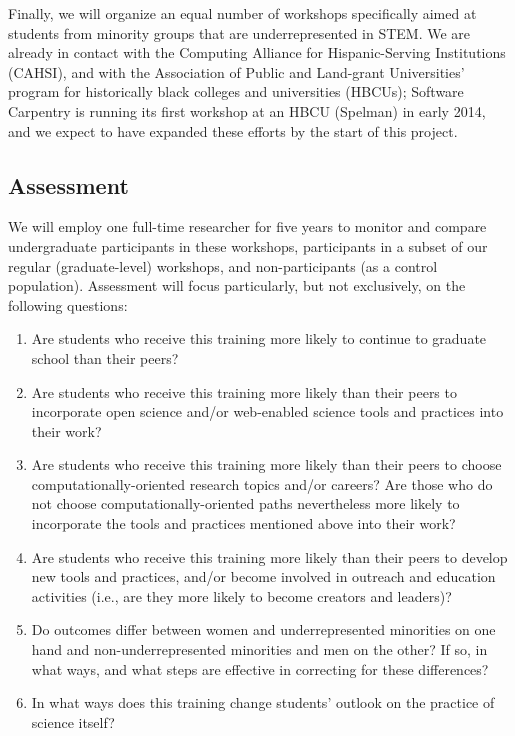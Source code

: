 \documentclass[11pt]{article}
\begin{document}
Finally, we will organize an equal number of workshops specifically
aimed at students from minority groups that are underrepresented in
STEM.  We are already in contact with the Computing Alliance for
Hispanic-Serving Institutions (CAHSI), and with the Association of
Public and Land-grant Universities' program for historically black
colleges and universities (HBCUs); Software Carpentry is running its
first workshop at an HBCU (Spelman) in early 2014, and we expect to
have expanded these efforts by the start of this project.

\subsection{Assessment}

We will employ one full-time researcher for five years to monitor and
compare undergraduate participants in these workshops, participants in
a subset of our regular (graduate-level) workshops, and
non-participants (as a control population).  Assessment will focus
particularly, but not exclusively, on the following questions:

\begin{enumerate}

\item
  Are students who receive this training more likely to continue to
  graduate school than their peers?

\item
  Are students who receive this training more likely than their peers
  to incorporate open science and/or web-enabled science tools and
  practices into their work?

\item
  Are students who receive this training more likely than their peers
  to choose computationally-oriented research topics and/or careers?
  Are those who do not choose computationally-oriented paths
  nevertheless more likely to incorporate the tools and practices
  mentioned above into their work?

\item
  Are students who receive this training more likely than their peers
  to develop new tools and practices, and/or become involved in
  outreach and education activities (i.e., are they more likely to
  become creators and leaders)?

\item
  Do outcomes differ between women and underrepresented minorities on
  one hand and non-underrepresented minorities and men on the other?
  If so, in what ways, and what steps are effective in correcting for
  these differences?

\item
  In what ways does this training change students' outlook on the
  practice of science itself?

\end{enumerate}
\end{document}
